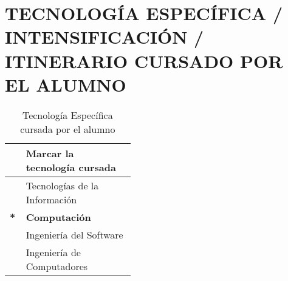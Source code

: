 \documentclass{pre-tfg}
\begin{document}
\section{TECNOLOGÍA ESPECÍFICA / INTENSIFICACIÓN / ITINERARIO CURSADO POR EL ALUMNO}

\begin{table}[hp]
  \centering
  \caption{Tecnología Específica cursada por el alumno}
  \label{tab:tec-especifica}

  \begin{tabular}{p{0.01\linewidth}p{0.4\linewidth}}
    &\textbf{Marcar la tecnología cursada} \\
    \hline
    & Tecnologías de la Información \\
    \textbf{*} &\textbf{Computación} \\
    &Ingeniería del Software \\
    &Ingeniería de Computadores \\
    \hline
  \end{tabular}
\end{table}
\end{document}
